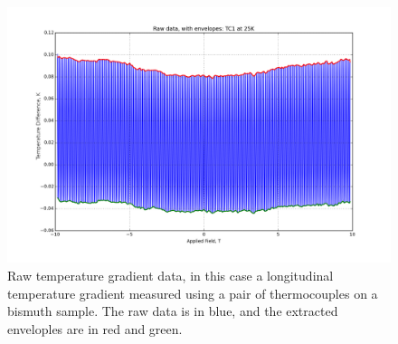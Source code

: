\documentclass{thesis-umich}
\begin{document}
\begin{figure}
	\caption[Raw temperature gradient data]{Raw temperature gradient data, in this case a longitudinal temperature gradient measured using a pair of thermocouples on a bismuth sample. The raw data is in blue, and the extracted enveloples are in red and green.}
	\label{fig:raw_data}
	\includegraphics[width=\columnwidth]{figures/25K_TC1_Raw.png}
\end{figure}
\end{document}
